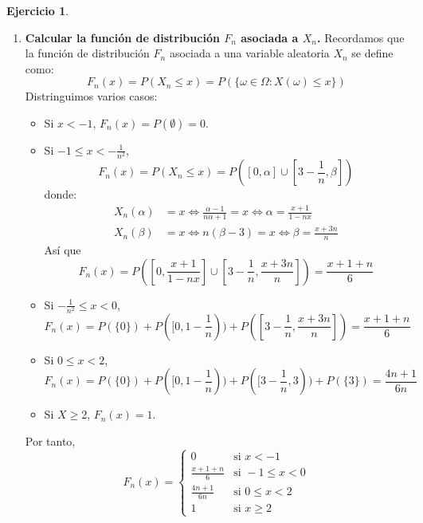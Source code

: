 \documentclass{report}
\theoremstyle{remark}
\theoremstyle{remark}
\theoremstyle{remark}
\theoremstyle{definition}
\theoremstyle{definition}
\theoremstyle{definition}
\theoremstyle{definition}
\newtheorem*{exercise}{Ejercicio}
\begin{document}
\begin{exercise}
\begin{enumerate}
        \item \textbf{Calcular la función de distribución $F_n$ asociada a $X_n$.}
              Recordamos que la función de distribución $F_n$ asociada a una variable aleatoria $X_n$ se define como:
              $$F_n(x) = P(X_n \leq x) = P(\{ \omega \in \Omega : X(\omega) \leq x \})$$
              Distringuimos varios casos:
              \begin{itemize}
                  \item Si $x < -1$, $F_n(x) = P(\emptyset) = 0$.
                  \item Si $-1 \leq x < -\frac{1}{n^2}$,
                        $$F_n(x) = P(X_n \leq x) = P([0, \alpha] \cup [3-\frac{1}{n}, \beta])$$
                        donde:
                        \begin{align*}
                            X_n(\alpha) & = x \Leftrightarrow \frac{\alpha-1}{n\alpha + 1} = x \Leftrightarrow \alpha = \frac{x+1}{1-nx} \\
                            X_n(\beta)  & = x \Leftrightarrow n(\beta - 3) = x \Leftrightarrow \beta = \frac{x+3n}{n}
                        \end{align*}
                        Así que
                        $$F_n(x) = P([0, \frac{x+1}{1-nx}] \cup [3-\frac{1}{n}, \frac{x+3n}{n}]) = \frac{x+1+n}{6}$$
                  \item Si $-\frac{1}{n^2} \leq x < 0$,
                        $$F_n(x) =  P(\{0\}) + P([0, 1-\frac{1}{n})) + P([3-\frac{1}{n}, \frac{x+3n}{n}]) = \frac{x+1+n}{6}$$
                  \item Si $0 \leq x < 2$,
                        $$F_n(x) =  P(\{0\}) + P([0, 1-\frac{1}{n})) + P([3-\frac{1}{n}, 3)) + P(\{3\}) = \frac{4n+1}{6n}$$
                  \item Si $X \geq 2$, $F_n(x) = 1$.
              \end{itemize}
              Por tanto,
              $$F_n(x) = \begin{cases}
                      0               & \text{si } x < -1        \\
                      \frac{x+1+n}{6} & \text{si } -1 \leq x < 0 \\
                      \frac{4n+1}{6n} & \text{si } 0 \leq x < 2  \\
                      1               & \text{si } x \geq 2
                  \end{cases}$$


\end{enumerate}
\end{exercise}
\end{document}
